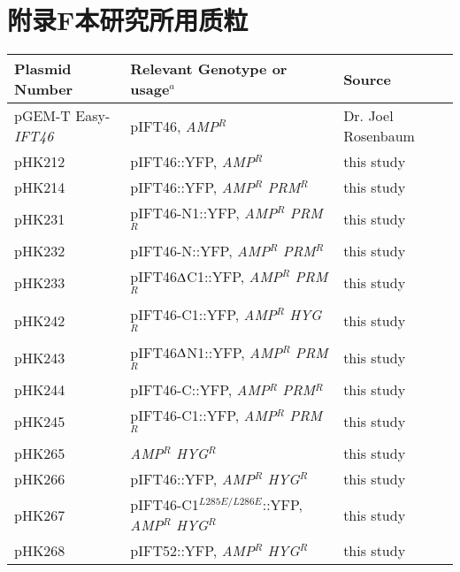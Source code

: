 \chapter{附录F\quad 本研究所用质粒}\label{appen:F}
\renewcommand{\leftmark}{附录F\quad 本研究所用质粒}
\setcounter{chapter}{6}
\setcounter{figure}{0}
\setcounter{table}{0}
\begin{table}[!ht]
\small
\centering
\begin{tabular}[c]{*{3}{l} @{}}
\toprule
\textbf{Plasmid Number} & \textbf{Relevant Genotype or usage}\textbf{$^a$} & \textbf{Source}\\
\midrule
pGEM-T Easy-\textit{IFT46} & pIFT46, \textit{AMP}$^R$ & Dr. Joel Rosenbaum\\
pHK212 & pIFT46::YFP, \textit{AMP}$^R$ & this study\\
pHK214 & pIFT46::YFP, \textit{AMP}$^R$ \textit{PRM}$^R$ & this study\\
pHK231 & pIFT46-N1::YFP, \textit{AMP}$^R$ \textit{PRM}$^R$ & this study\\
pHK232 & pIFT46-N::YFP, \textit{AMP}$^R$ \textit{PRM}$^R$ & this study\\
pHK233 & pIFT46$\Updelta$C1::YFP, \textit{AMP}$^R$ \textit{PRM}$^R$ & this study\\
pHK242 & pIFT46-C1::YFP, \textit{AMP}$^R$ \textit{HYG}$^R$ & this study\\
pHK243 & pIFT46$\Updelta$N1::YFP, \textit{AMP}$^R$ \textit{PRM}$^R$ & this study\\
pHK244 & pIFT46-C::YFP, \textit{AMP}$^R$ \textit{PRM}$^R$ & this study\\
pHK245 & pIFT46-C1::YFP, \textit{AMP}$^R$ \textit{PRM}$^R$ & this study\\
pHK265 & \textit{AMP}$^R$ \textit{HYG}$^R$ & this study\\
pHK266 & pIFT46::YFP, \textit{AMP}$^R$ \textit{HYG}$^R$ & this study\\
pHK267 & pIFT46-C1$^{L285E/L286E}$::YFP, \textit{AMP}$^R$ \textit{HYG}$^R$ & this study\\
pHK268 & pIFT52::YFP, \textit{AMP}$^R$ \textit{HYG}$^R$ & this study\\

\end{tabular}
\end{table}
